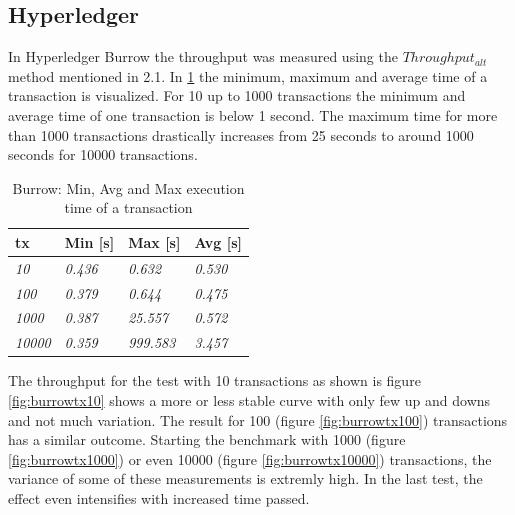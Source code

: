 \subsection{Hyperledger}

In Hyperledger Burrow the throughput was measured using the $Throughput_{alt}$ method mentioned in 2.1.
In \ref{table:4} the minimum, maximum and average time of a transaction is visualized. For 10 up to 1000 transactions
the minimum and average time of one transaction is below 1 second. The maximum time for more than 1000 transactions
drastically increases from 25 seconds to around 1000 seconds for 10000 transactions.

\begin{table}[!h]
\centering
\begin{tabular}{l|l|l|l|}
\hline
\multicolumn{1}{|l|}{\textbf{tx}} & \textbf{Min {[}s{]}} & \textbf{Max {[}s{]}} & \textbf{Avg {[}s{]}} \\ \hline
\multicolumn{1}{|l|}{\textit{10}} & \textit{0.436} & \textit{0.632} & \textit{0.530} \\ \hline
\multicolumn{1}{|l|}{\textit{100}} & \textit{0.379} & \textit{0.644} & \textit{0.475} \\ \hline
\multicolumn{1}{|l|}{\textit{1000}} & \textit{0.387} & \textit{25.557} & \textit{0.572} \\ \hline
\multicolumn{1}{|l|}{\textit{10000}} & \textit{0.359} & \textit{999.583} & \textit{3.457} \\ \hline 
\end{tabular}
\caption{Burrow: Min, Avg and Max execution time of a transaction}
\label{table:4}
\end{table}

The throughput for the test with 10 transactions as shown is figure \ref{fig:burrowtx10} shows a more or less
stable curve with only few up and downs and not much variation. The result for 100 (figure \ref{fig:burrowtx100})
transactions has a similar outcome. Starting the benchmark with 1000 (figure \ref{fig:burrowtx1000}) or even 10000
(figure \ref{fig:burrowtx10000}) transactions, the variance of some of these measurements is extremly high. In
the last test, the effect even intensifies with increased time passed.

\begin{minipage}{\linewidth}
   \label{fig:burrowtx10}
\end{minipage}

